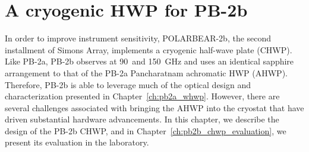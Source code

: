 \chapter[PB-2b CHWP]{A cryogenic HWP for PB-2b}
\label{ch:chwp_design}

In order to improve instrument sensitivity, POLARBEAR-2b, the second installment of Simons Array, implements a cryogenic half-wave plate (CHWP). Like PB-2a, PB-2b observes at 90~and 150~GHz and uses an identical sapphire arrangement to that of the PB-2a Pancharatnam achromatic HWP (AHWP). Therefore, PB-2b is able to leverage much of the optical design and characterization presented in Chapter~\ref{ch:pb2a_whwp}. However, there are several challenges associated with bringing the AHWP into the cryostat that have driven substantial hardware advancements. In this chapter, we describe the design of the PB-2b CHWP, and in Chapter~\ref{ch:pb2b_chwp_evaluation}, we present its evaluation in the laboratory.

